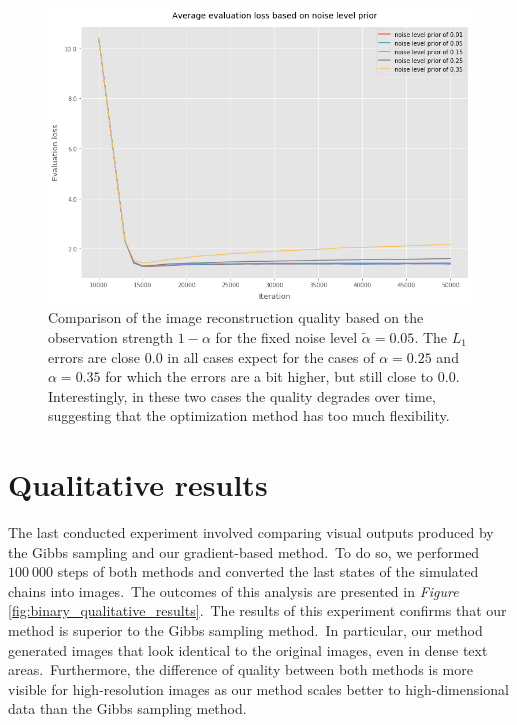 \documentclass[a4paper, 11pt, onecolumn, openany, titlepage]{report}
\theoremstyle{default_theorem_style}\newtheorem{theorem}{Theorem}
\theoremstyle{default_theorem_style}\newtheorem{definition}{Definition}
\begin{document}
\begin{figure}[H]
\centering
\includegraphics[scale=0.55]{binary_noise_level_prior_plots}
\caption{Comparison of the image reconstruction quality based on the observation strength $1 - \alpha$ for the
fixed noise level $\tilde{\alpha} = 0.05$. The $L_1$ errors are close $0.0$ in all cases expect for the cases of
$\alpha = 0.25$ and $\alpha = 0.35$ for which the errors are a bit higher, but still close to $0.0$. Interestingly,
in these two cases the quality degrades over time, suggesting that the optimization method has too
much flexibility.}
\label{fig:binary_noise_level_prior_plots}
\end{figure}

\section{Qualitative results}

The last conducted experiment involved comparing visual outputs produced by the Gibbs sampling and our
gradient-based method.\ To do so, we performed $100\ 000$ steps of both methods and converted the last states
of the simulated chains into images.\ The outcomes of this analysis are presented in \textit{Figure}
\ref{fig:binary_qualitative_results}.\ The results of this experiment confirms that our method is superior to
the Gibbs sampling method.\ In particular, our method generated images that look identical to the original images,
even in dense text areas.\ Furthermore, the difference of quality between both methods is more visible for
high-resolution images as our method scales better to high-dimensional data than the Gibbs sampling method.
\end{document}

